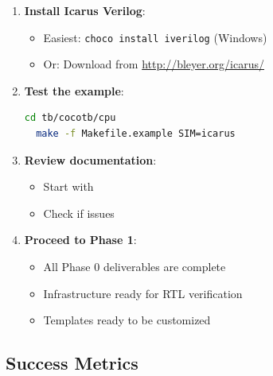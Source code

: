 \begin{record}

\begin{enumerate}
\def\labelenumi{\arabic{enumi}.}
\item
  \textbf{Install Icarus Verilog}:

  \begin{itemize}
  \tightlist
  \item
    Easiest: \texttt{choco\ install\ iverilog} (Windows)
  \item
    Or: Download from
    \href{http://bleyer.org/icarus/}{http:/\allowbreak{}/\allowbreak{}bleyer.org/\allowbreak{}icarus/}
  \end{itemize}
\item
  \textbf{Test the example}:

  \begin{lstlisting}[language=bash]
  cd tb/cocotb/cpu
  make -f Makefile.example SIM=icarus
  \end{lstlisting}
\item
  \textbf{Review documentation}:

  \begin{itemize}
  \tightlist
  \item
    Start with 
  \item
    Check  if issues
  \end{itemize}
\item
  \textbf{Proceed to Phase 1}:

  \begin{itemize}
  \tightlist
  \item
    All Phase 0 deliverables are complete
  \item
    Infrastructure ready for RTL verification
  \item
    Templates ready to be customized
  \end{itemize}
\end{enumerate}

\end{record}

\subsection{Success Metrics}\label{cr:app:archive-cocotb-setup-summary:success-metrics}

